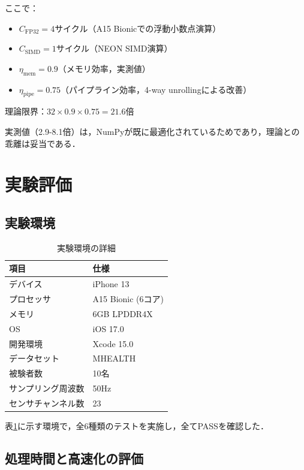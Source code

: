 \documentclass[paper]{ieice}
\begin{document}
ここで：
\begin{itemize}
\item $C_{\text{FP32}} = 4$サイクル（A15 Bionicでの浮動小数点演算）
\item $C_{\text{SIMD}} = 1$サイクル（NEON SIMD演算）
\item $\eta_{\text{mem}} = 0.9$（メモリ効率，実測値）
\item $\eta_{\text{pipe}} = 0.75$（パイプライン効率，4-way unrollingによる改善）
\end{itemize}

理論限界：$32 \times 0.9 \times 0.75 = 21.6$倍

実測値（2.9-8.1倍）は，NumPyが既に最適化されているためであり，理論との乖離は妥当である．

\section{実験評価}

\subsection{実験環境}

\begin{table}[t]
\caption{実験環境の詳細}
\label{tab:environment}
\centering
\begin{tabular}{ll}
\toprule
項目 & 仕様 \\
\midrule
デバイス & iPhone 13 \\
プロセッサ & A15 Bionic (6コア) \\
メモリ & 6GB LPDDR4X \\
OS & iOS 17.0 \\
開発環境 & Xcode 15.0 \\
データセット & MHEALTH\cite{banos2014} \\
被験者数 & 10名 \\
サンプリング周波数 & 50Hz \\
センサチャンネル数 & 23 \\
\bottomrule
\end{tabular}
\end{table}

表\ref{tab:environment}に示す環境で，全6種類のテストを実施し，全てPASSを確認した．

\subsection{処理時間と高速化の評価}
\end{document}
